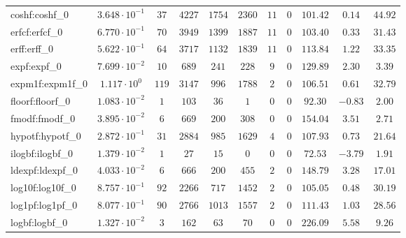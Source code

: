 \begin{tabular}{|l|c|c|c|c|c|c|c|c|c|c|}
coshf:coshf\_0               & $ 3.648 \cdot 10^{-1} $ & $ 37     $ & $ 4227  $ & $ 1754  $ & $ 2360  $ & $ 11  $ & $ 0 $ & $ 101.42      $ & $ 0.14    $ & $ 44.92   $ \\
erfcf:erfcf\_0               & $ 6.770 \cdot 10^{-1} $ & $ 70     $ & $ 3949  $ & $ 1399  $ & $ 1887  $ & $ 11  $ & $ 0 $ & $ 103.40      $ & $ 0.33    $ & $ 31.43   $ \\
erff:erff\_0                 & $ 5.622 \cdot 10^{-1} $ & $ 64     $ & $ 3717  $ & $ 1132  $ & $ 1839  $ & $ 11  $ & $ 0 $ & $ 113.84      $ & $ 1.22    $ & $ 33.35   $ \\
expf:expf\_0                 & $ 7.699 \cdot 10^{-2} $ & $ 10     $ & $ 689   $ & $ 241   $ & $ 228   $ & $ 9   $ & $ 0 $ & $ 129.89      $ & $ 2.30    $ & $ 3.39    $ \\
expm1f:expm1f\_0             & $ 1.117 \cdot 10^{0}  $ & $ 119    $ & $ 3147  $ & $ 996   $ & $ 1788  $ & $ 2   $ & $ 0 $ & $ 106.51      $ & $ 0.61    $ & $ 32.79   $ \\
floorf:floorf\_0             & $ 1.083 \cdot 10^{-2} $ & $ 1      $ & $ 103   $ & $ 36    $ & $ 1     $ & $ 0   $ & $ 0 $ & $ 92.30       $ & $ -0.83   $ & $ 2.00    $ \\
fmodf:fmodf\_0               & $ 3.895 \cdot 10^{-2} $ & $ 6      $ & $ 669   $ & $ 200   $ & $ 308   $ & $ 0   $ & $ 0 $ & $ 154.04      $ & $ 3.51    $ & $ 2.71    $ \\
hypotf:hypotf\_0             & $ 2.872 \cdot 10^{-1} $ & $ 31     $ & $ 2884  $ & $ 985   $ & $ 1629  $ & $ 4   $ & $ 0 $ & $ 107.93      $ & $ 0.73    $ & $ 21.64   $ \\
ilogbf:ilogbf\_0             & $ 1.379 \cdot 10^{-2} $ & $ 1      $ & $ 27    $ & $ 15    $ & $ 0     $ & $ 0   $ & $ 0 $ & $ 72.53       $ & $ -3.79   $ & $ 1.91    $ \\
ldexpf:ldexpf\_0             & $ 4.033 \cdot 10^{-2} $ & $ 6      $ & $ 666   $ & $ 200   $ & $ 455   $ & $ 2   $ & $ 0 $ & $ 148.79      $ & $ 3.28    $ & $ 17.01   $ \\
log10f:log10f\_0             & $ 8.757 \cdot 10^{-1} $ & $ 92     $ & $ 2266  $ & $ 717   $ & $ 1452  $ & $ 2   $ & $ 0 $ & $ 105.05      $ & $ 0.48    $ & $ 30.19   $ \\
log1pf:log1pf\_0             & $ 8.077 \cdot 10^{-1} $ & $ 90     $ & $ 2766  $ & $ 1013  $ & $ 1557  $ & $ 2   $ & $ 0 $ & $ 111.43      $ & $ 1.03    $ & $ 28.56   $ \\
logbf:logbf\_0               & $ 1.327 \cdot 10^{-2} $ & $ 3      $ & $ 162   $ & $ 63    $ & $ 70    $ & $ 0   $ & $ 0 $ & $ 226.09      $ & $ 5.58    $ & $ 9.26    $ \\

\end{tabular}
